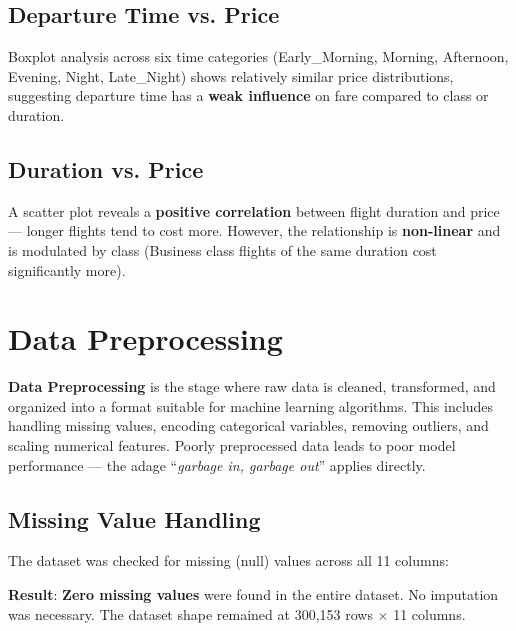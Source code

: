 \documentclass[12pt, a4paper]{article}
\begin{document}
\subsection{Departure Time vs. Price}

Boxplot analysis across six time categories (Early\_Morning, Morning, Afternoon, Evening, Night, Late\_Night) shows relatively similar price distributions, suggesting departure time has a \textbf{weak influence} on fare compared to class or duration.

\subsection{Duration vs. Price}

A scatter plot reveals a \textbf{positive correlation} between flight duration and price — longer flights tend to cost more. However, the relationship is \textbf{non-linear} and is modulated by class (Business class flights of the same duration cost significantly more).

\newpage

\section{Data Preprocessing}

\begin{keyterm}
\textbf{Data Preprocessing} is the stage where raw data is cleaned, transformed, and organized into a format suitable for machine learning algorithms. This includes handling missing values, encoding categorical variables, removing outliers, and scaling numerical features. Poorly preprocessed data leads to poor model performance — the adage ``\textit{garbage in, garbage out}'' applies directly.
\end{keyterm}

\subsection{Missing Value Handling}

The dataset was checked for missing (null) values across all 11 columns:

\begin{resultbox}
\textbf{Result}: \textbf{Zero missing values} were found in the entire dataset. No imputation was necessary. The dataset shape remained at 300,153 rows $\times$ 11 columns.
\end{resultbox}
\end{document}
